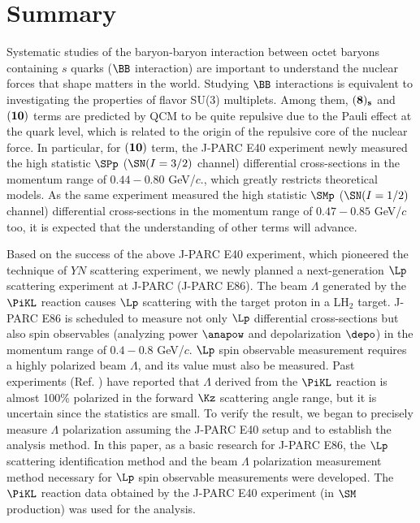 %
\graphicspath{{./pictures/chapter_summary/}}

\chapter{Summary} 
\label{chap-summary}
Systematic studies of the baryon-baryon interaction between octet baryons containing $s$ quarks ($\BB$ interaction) are important to understand the nuclear forces that shape matters in the world. Studying $\BB$ interactions is equivalent to investigating the properties of flavor SU(3) multiplets. Among them, ${\bf(8)_s}$ and ${\bf(10)}$ terms are predicted by QCM to be quite repulsive due to the Pauli effect at the quark level, which is related to the origin of the repulsive core of the nuclear force. In particular, for ${\bf(10)}$ term, the J-PARC E40 experiment newly measured the high statistic $\SPp$ ($\SN (I=3/2)$ channel) differential cross-sections in the momentum range of $0.44-0.80$ GeV/$c$., which greatly restricts theoretical models. As the same experiment measured the high statistic $\SMp$ ($\SN (I=1/2)$ channel) differential cross-sections in the momentum range of $0.47-0.85$ GeV/$c$ too, it is expected that the understanding of other terms will advance.

Based on the success of the above J-PARC E40 experiment, which pioneered the technique of $YN$ scattering experiment, we newly planned a next-generation $\Lp$ scattering experiment at J-PARC (J-PARC E86). The beam $\Lambda$ generated by the $\PiKL$ reaction causes $\Lp$ scattering with the target proton in a LH$_{2}$ target. J-PARC E86 is scheduled to measure not only $\Lp$ differential cross-sections but also spin observables (analyzing power $\anapow$ and depolarization $\depo$) in the momentum range of $0.4-0.8$ GeV/$c$. $\Lp$ spin observable measurement requires a highly polarized beam $\Lambda$, and its value must also be measured. Past experiments (Ref. \cite{Baker}) have reported that $\Lambda$ derived from the $\PiKL$ reaction is almost 100\% polarized in the forward $\Kz$ scattering angle range, but it is uncertain since the statistics are small. To verify the result, we began to precisely measure $\Lambda$ polarization assuming the J-PARC E40 setup and to establish the analysis method. In this paper, as a basic research for J-PARC E86, the $\Lp$ scattering identification method and the beam $\Lambda$ polarization measurement method necessary for $\Lp$ spin observable measurements were developed. The $\PiKL$ reaction data obtained by the J-PARC E40 experiment (in $\SM$ production) was used for the analysis.

